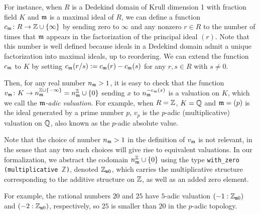 \documentclass[sigplan,10pt,anonymous,review]{acmart}
\begin{document}
For instance, when $R$ is a Dedekind domain of Krull dimension 1 with fraction field $K$ and $\mathfrak{m}$ is a maximal ideal of $R$, we can define a function $c_{\mathfrak{m}} \colon R \to \mathbb{Z} \cup \{ \infty\}$  by sending zero to $\infty$ and any nonzero $r \in R$ to the number of times that $\mathfrak{m}$ appears in the factorization of the principal ideal $(r)$. Note that this number is well defined because ideals in a Dedekind domain admit a unique factorization into maximal ideals, up to reordering. We can extend the function $c_{\mathfrak{m}}$ to $K$ by setting $c_{\mathfrak{m}} (r/s) := c_{\mathfrak{m}} (r) - c_{\mathfrak{m}} (s)$ for any $r, s \in R$ with $s \ne 0$.

Then, for any real number $n_{\mathfrak{m}} > 1$, it is easy to check that the function
$ v_{\mathfrak{m}}\colon K \to n_{\mathfrak{m}}^{\mathbb{Z} \cup \{-\infty\}} = n_{\mathfrak{m}}^\mathbb{Z} \cup \{0\}$  sending $x$ to $n_{\mathfrak{m}}^{-c_{\mathfrak{m}}(x)}$ is a valuation on $K$, which we call the \textit{$\mathfrak{m}$-adic valuation}. For example, when $R = \mathbb{Z}$, $K = \mathbb{Q}$ and $\mathfrak{m} = (p)$ is the ideal generated by a prime number $p$, $v_p$ is the $p$-adic (multiplicative) valuation on $\mathbb{Q}$, also known as the $p$-adic absolute value.

Note that the choice of number $n_{\mathfrak{m}} > 1$ in the definition of $v_{\mathfrak{m}}$ is not relevant, in the sense that any two such choices will give rise to equivalent valuations. In our formalization, we abstract the codomain $n_{\mathfrak{m}}^\mathbb{Z} \cup \{0\}$ using the type
\texttt{with\_zero (multiplicative $\mathbb{Z}$)}, denoted $\mathbb{Z}_{\mathtt{m}0}$,
which carries the multiplicative structure corresponding to the additive structure on $\mathbb{Z}$, as well as an added zero element. 

For example, the rational numbers $20$ and $25$ have $5$-adic valuation $(-1 : \mathbb{Z}_{\mathtt{m}0})$ and $(-2 : \mathbb{Z}_{\mathtt{m}0})$, respectively, so $25$ is smaller than $20$ in the $p$-adic topology. 
\end{document}
